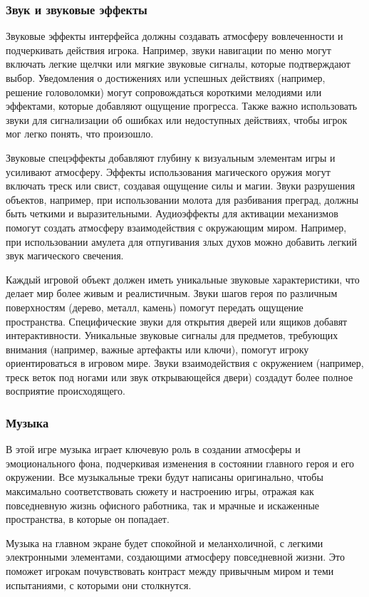 \documentclass{article}
\begin{document}
	\subsubsection{Звук и звуковые эффекты}
	Звуковые эффекты интерфейса должны создавать атмосферу вовлеченности и подчеркивать действия игрока. Например, звуки навигации по меню могут включать легкие щелчки или мягкие звуковые сигналы, которые подтверждают выбор. Уведомления о достижениях или успешных действиях (например, решение головоломки) могут сопровождаться короткими мелодиями или эффектами, которые добавляют ощущение прогресса. Также важно использовать звуки для сигнализации об ошибках или недоступных действиях, чтобы игрок мог легко понять, что произошло.
	
	Звуковые спецэффекты добавляют глубину к визуальным элементам игры и усиливают атмосферу. Эффекты использования магического оружия могут включать треск или свист, создавая ощущение силы и магии. Звуки разрушения объектов, например, при использовании молота для разбивания преград, должны быть четкими и выразительными. Аудиоэффекты для активации механизмов помогут создать атмосферу взаимодействия с окружающим миром. Например, при использовании амулета для отпугивания злых духов можно добавить легкий звук магического свечения.
	
	Каждый игровой объект должен иметь уникальные звуковые характеристики, что делает мир более живым и реалистичным. Звуки шагов героя по различным поверхностям (дерево, металл, камень) помогут передать ощущение пространства. Специфические звуки для открытия дверей или ящиков добавят интерактивности. Уникальные звуковые сигналы для предметов, требующих внимания (например, важные артефакты или ключи), помогут игроку ориентироваться в игровом мире. Звуки взаимодействия с окружением (например, треск веток под ногами или звук открывающейся двери) создадут более полное восприятие происходящего.
	\subsubsection{Музыка}
	В этой игре музыка играет ключевую роль в создании атмосферы и эмоционального фона, подчеркивая изменения в состоянии главного героя и его окружении. Все музыкальные треки будут написаны оригинально, чтобы максимально соответствовать сюжету и настроению игры, отражая как повседневную жизнь офисного работника, так и мрачные и искаженные пространства, в которые он попадает.
	
	Музыка на главном экране будет спокойной и меланхоличной, с легкими электронными элементами, создающими атмосферу повседневной жизни. Это поможет игрокам почувствовать контраст между привычным миром и теми испытаниями, с которыми они столкнутся.
	
\end{document}
